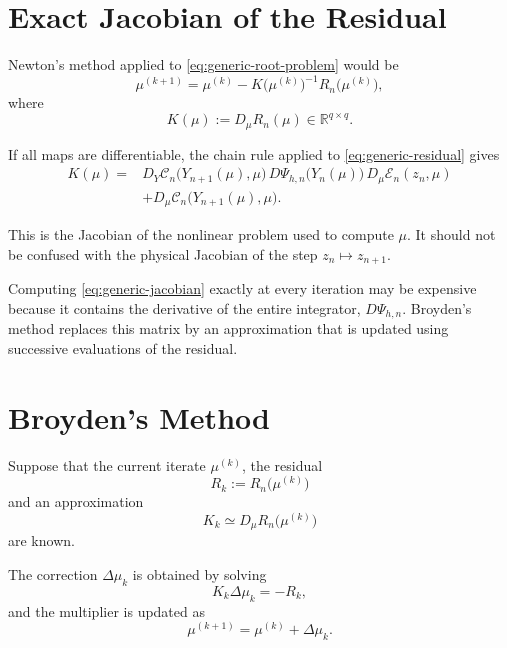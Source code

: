 \documentclass[11pt,a4paper]{article}
\newcommand{\R}{\mathbb{R}}
\begin{document}
\section{Exact Jacobian of the Residual}

Newton's method applied to \eqref{eq:generic-root-problem} would be
\begin{equation}
    \mu^{(k+1)}
    =\mu^{(k)}
    -K\bigl(\mu^{(k)}\bigr)^{-1}
     R_n\bigl(\mu^{(k)}\bigr),
    \label{eq:newton}
\end{equation}
where
\begin{equation}
    K(\mu):=D_\mu R_n(\mu)\in\R^{q\times q}.
    \label{eq:residual-jacobian}
\end{equation}

If all maps are differentiable, the chain rule applied to
\eqref{eq:generic-residual} gives
\begin{equation}
\boxed{
\begin{aligned}
    K(\mu)
    ={}&D_Y\mathcal C_n\bigl(Y_{n+1}(\mu),\mu\bigr)
       \,D\Psi_{h,n}\bigl(Y_n(\mu)\bigr)
       \,D_\mu\mathcal E_n(z_n,\mu)\\
      &+D_\mu\mathcal C_n\bigl(Y_{n+1}(\mu),\mu\bigr).
\end{aligned}}
\label{eq:generic-jacobian}
\end{equation}

This is the Jacobian of the nonlinear problem used to compute $\mu$. It
should not be confused with the physical Jacobian of the step
$z_n\mapsto z_{n+1}$.

Computing \eqref{eq:generic-jacobian} exactly at every iteration may be
expensive because it contains the derivative of the entire integrator,
$D\Psi_{h,n}$. Broyden's method replaces this matrix by an approximation that
is updated using successive evaluations of the residual.

\section{Broyden's Method}

Suppose that the current iterate $\mu^{(k)}$, the residual
\begin{equation}
    R_k:=R_n\bigl(\mu^{(k)}\bigr)
    \label{eq:current-residual}
\end{equation}
and an approximation
\[
    K_k\simeq D_\mu R_n\bigl(\mu^{(k)}\bigr)
\]
are known.

The correction $\Delta\mu_k$ is obtained by solving
\begin{equation}
    K_k\Delta\mu_k=-R_k,
    \label{eq:linear-correction}
\end{equation}
and the multiplier is updated as
\begin{equation}
    \mu^{(k+1)}=\mu^{(k)}+\Delta\mu_k.
    \label{eq:multiplier-update}
\end{equation}
\end{document}
